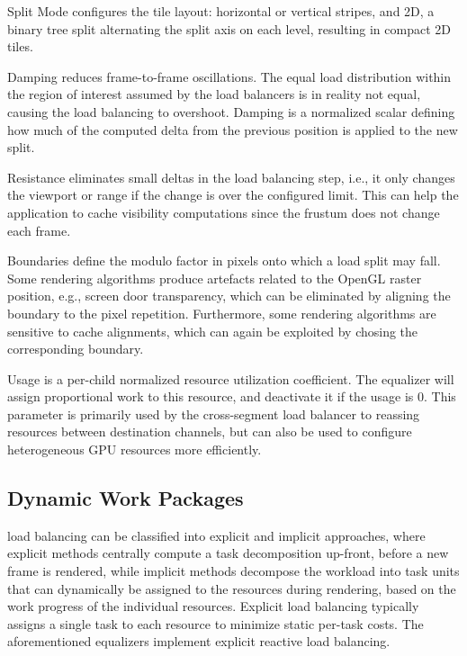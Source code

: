 \begin{compactdesc}
\item[Split Mode] configures the tile layout: horizontal or vertical stripes,
and 2D, a binary tree split alternating the split axis on each level, resulting
in compact 2D tiles.
\item[Damping] reduces frame-to-frame oscillations. The equal load distribution
within the region of interest assumed by the load balancers is in reality not
equal, causing the load balancing to overshoot. Damping is a normalized scalar
defining how much of the computed delta from the previous position is applied to
the new split.

\item[Resistance] eliminates small deltas in the load balancing step, i.e., it
only changes the viewport or range if the change is over the configured limit.
This can help the application to cache visibility computations since the
frustum does not change each frame.

\item[Boundaries] define the modulo factor in pixels onto which a load split may
fall. Some rendering algorithms produce artefacts related to the OpenGL raster
position, e.g., screen door transparency, which can be eliminated by aligning
the boundary to the pixel repetition. Furthermore, some rendering algorithms are
sensitive to cache alignments, which can again be exploited by chosing the
corresponding boundary.

\item[Usage] is a per-child normalized resource utilization coefficient. The
equalizer will assign proportional work to this resource, and deactivate it if
the usage is 0. This parameter is primarily used by the cross-segment load
balancer to reassing resources between destination channels, but can also be
used to configure heterogeneous GPU resources more efficiently.

\end{compactdesc}

\subsection{Dynamic Work Packages}

load balancing can be classified into explicit and implicit approaches, where
explicit methods centrally compute a task decomposition up-front, before a new
frame is rendered, while implicit methods decompose the workload into task
units that can dynamically be assigned to the resources during rendering, based
on the work progress of the individual resources. Explicit load balancing
typically assigns a single task to each resource to minimize static per-task
costs. The aforementioned equalizers implement explicit reactive load
balancing.

